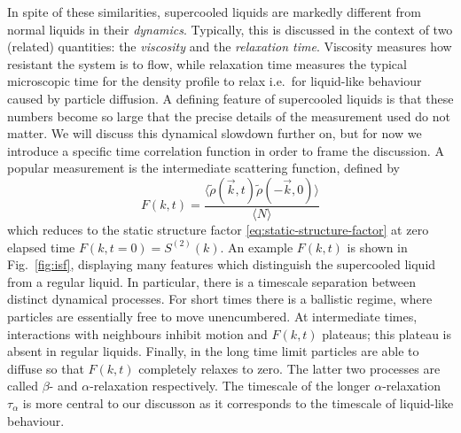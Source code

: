 \documentclass[11pt,twoside]{report}
\begin{document}
In spite of these similarities, supercooled liquids are markedly different from normal liquids in their \emph{dynamics}.
Typically, this is discussed in the context of two (related) quantities: the \emph{viscosity} and the \emph{relaxation time}.
Viscosity measures how resistant the system is to flow, while relaxation time measures the typical microscopic time for the density profile to relax i.e.\ for liquid-like behaviour caused by particle diffusion.
A defining feature of supercooled liquids is that these numbers become so large that the precise details of the measurement used do not matter.
We will discuss this dynamical slowdown further on, but for now we introduce a specific time correlation function in order to frame the discussion.
A popular measurement is the intermediate scattering function, defined by \cite{JanssenFP2018}
\begin{equation}\label{eq:isf}
  F(k, t)
  =
  \frac{
    \big\langle \tilde{\rho}(\vec{k}, t) \tilde{\rho}(-\vec{k}, 0) \big\rangle
  }{
    \langle N \rangle
  }
\end{equation}
which reduces to the static structure factor \eqref{eq:static-structure-factor} at zero elapsed time $F(k, t=0) = S^{(2)}(k)$.
An example $F(k,t)$ is shown in Fig.\ \ref{fig:isf}, displaying many features which distinguish the supercooled liquid from a regular liquid.
In particular, there is a timescale separation between distinct dynamical processes.
For short times there is a ballistic regime, where particles are essentially free to move unencumbered.
At intermediate times, interactions with neighbours inhibit motion and $F(k,t)$ plateaus; this plateau is absent in regular liquids.
Finally, in the long time limit particles are able to diffuse so that $F(k,t)$ completely relaxes to zero.
The latter two processes are called $\beta$- and $\alpha$-relaxation respectively.
The timescale of the longer $\alpha$-relaxation $\tau_\alpha$ is more central to our discusson as it corresponds to the timescale of liquid-like behaviour.
\end{document}
